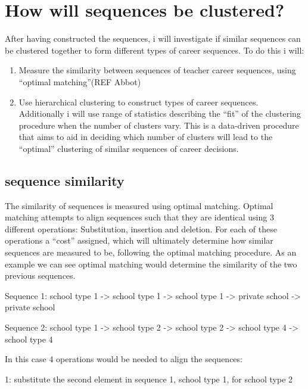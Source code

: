 \documentclass[
]{article}
\begin{document}
\hypertarget{how-will-sequences-be-clustered}{%
\section{How will sequences be clustered?}\label{how-will-sequences-be-clustered}}

After having constructed the sequences, i will investigate if similar sequences can be clustered together to form different types of career sequences. To do this i will:

\begin{enumerate}
\def\labelenumi{\arabic{enumi})}
\item
  Measure the similarity between sequences of teacher career sequences, using ``optimal matching''(REF Abbot)
\item
  Use hierarchical clustering to construct types of career sequences. Additionally i will use range of statistics describing the ``fit'' of the clustering procedure when the number of clusters vary. This is a data-driven procedure that aims to aid in deciding which number of clusters will lead to the ``optimal'' clustering of similar sequences of career decisions.
\end{enumerate}

\hypertarget{sequence-similarity}{%
\subsection{sequence similarity}\label{sequence-similarity}}

The similarity of sequences is measured using optimal matching. Optimal matching attempts to align sequences such that they are identical using 3 different operations: Substitution, insertion and deletion. For each of these operations a ``cost'' assigned, which will ultimately determine how similar sequences are measured to be, following the optimal matching procedure. As an example we can see optimal matching would determine the similarity of the two previous sequences.

Sequence 1: school type 1 -\textgreater{} school type 1 -\textgreater{} school type 1 -\textgreater{} private school -\textgreater{} private school

Sequence 2: school type 1 -\textgreater{} school type 2 -\textgreater{} school type 2 -\textgreater{} school type 4 -\textgreater{} school type 4

In this case 4 operations would be needed to align the sequences:

1: substitute the second element in sequence 1, school type 1, for school type 2
\end{document}
